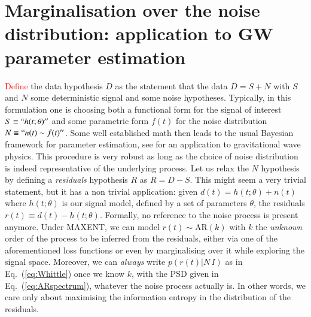 \documentclass{aa}
\begin{document}
\section{Marginalisation over the noise distribution: application to GW parameter estimation} \label{sec:applications}


\textcolor{red}{Define} the data hypothesis $D$ as the statement that the data $D = S + N$ with $S$ and $N$ some deterministic signal and some noise hypotheses. Typically, in this formulation one is choosing both a functional form for the signal of interest $S\equiv ``h(t;\theta)''$ and some parametric form $f(t)$ for the noise distribution $N\equiv ``n(t) \sim f(t)''$. Some well established math then leads to the usual Bayesian framework for parameter estimation, see \cite{lalinference} for an application to gravitational wave physics. This procedure is very robust as long as the choice of noise distribution is indeed representative of the underlying process. Let us relax the $N$ hypothesis by defining a \emph{residuals} hypothesis $R$ as $R = D - S$. This might seem a very trivial statement, but it has a non trivial application: given  $d(t) = h(t;\theta) + n(t)$ where $h(t;\theta)$ is our signal model, defined by a set of parameters $\theta$,  the residuals $r(t) \equiv d(t) - h(t;\theta)$. Formally, no reference to the noise process is present anymore. Under MAXENT, we can model $r(t) \sim \mathrm{AR}(k)$ with $k$ the \emph{unknown} order of the process to be inferred from the residuals, either via one of the aforementioned loss functions or even by marginalising over it while exploring the signal space. Moreover, we can \emph{always} write $p(r(t)|N\,I)$ as in Eq.~(\ref{eq:Whittle}) once we know $k$, with the PSD given in Eq.~(\ref{eq:ARspectrum}), whatever the noise process actually is. In other words, we care only about maximising the information entropy in the distribution of the residuals.
\end{document}
